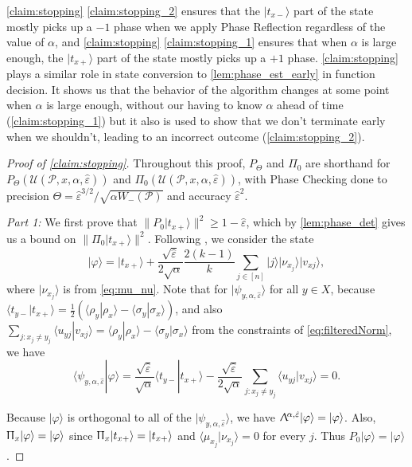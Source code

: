 \documentclass[cleveref, autoref, thm-restate,11pt]{article}
\theoremstyle{definition}
\newcommand{\sop}[1]{{\mathcal #1}}
\newcommand{\ket}[1]{|#1\rangle}
\newcommand{\braket}[2]{\langle{#1}|{#2}\rangle}
\newcommand{\Lalp}{{\Uplambda^{\!\alpha,\hat{\varepsilon}}}}
\newcommand{\PHxp}{\Uppi_{x}}
\newcommand{\Up}[4]{{\sop U({#1},{#2},{#3},{#4})}}
\begin{document}
\cref{claim:stopping} \cref{claim:stopping_2} ensures that the $\ket{t_{x-}}$ part of the state mostly
picks up a $-1$ phase when we apply Phase Reflection regardless of the value of $\alpha$, and \cref{claim:stopping} \cref{claim:stopping_1} ensures that when $\alpha$ is large enough, the $\ket{t_{x+}}$ part of the state mostly
picks up a $+1$ phase.
\cref{claim:stopping} plays a similar role in state conversion to \cref{lem:phase_est_early} in function decision. It shows us that
the behavior of the algorithm changes at some point when $\alpha$ is large enough,
without our having to know $\alpha$ ahead of time (\cref{claim:stopping_1}) but it 
also is used to show that we don't terminate early when we shouldn't, leading to an
incorrect outcome (\cref{claim:stopping_2}). 

\begin{proof}[Proof of \cref{claim:stopping}]
Throughout this proof, $P_\Theta$ and $\Pi_0$ are shorthand 
for $P_\Theta(\Up{\mathscr{P}}{x}{\alpha}{\hat{\varepsilon}})$ and 
$\Pi_0(\Up{\mathscr{P}}{x}{\alpha}{\hat{\varepsilon}})$, with Phase Checking done
to precision $\Theta=\hat{\varepsilon}^{3/2}/\sqrt{\alpha W_-(\mathscr P)}$ and accuracy 
$\hat{\varepsilon}^2$.

\vspace{.5cm}
\textit{Part 1:}
We first prove that
$\|P_0\ket{t_{x+}}\|^2\geq 1-\hat{\varepsilon}$, which by \cref{lem:phase_det} gives us a bound on $\|\Pi_0\ket{t_{x+}}\|^2$. Following \cite[Claim 4.4]{leeQuantumQueryComplexity2011}, we consider the state
\begin{equation}
\ket{\varphi}=\ket{t_{x+}}+\frac{\sqrt{\hat{\varepsilon}}}{2\sqrt{\alpha}}\frac{2(k-1)}{k}\sum_{j\in[n]}\ket{j}\ket{\nu_{x_j}}\ket{v_{xj}},
\end{equation}
where $\ket{\nu_{x_j}}$ is from \cref{eq:mu_nu}.
Note that for $\ket{\psi_{y,\alpha,\hat{\varepsilon}}}$ for all $y\in X$, because
$\braket{t_{y-}}{t_{x+}}=\frac{1}{2}\left(\braket{\rho_y}{\rho_x}-\braket{\sigma_y}{\sigma_x}\right)$,
and also $\sum_{j:x_j\neq
y_j}\braket{u_{yj}}{v_{xj}}=\braket{\rho_y}{\rho_x}-\braket{\sigma_y}{\sigma_x}$
from the constraints of \cref{eq:filteredNorm}, we have
\begin{equation}
\braket{\psi_{y,\alpha,\hat{\varepsilon}}}{\varphi}=\frac{\sqrt{\hat{\varepsilon}}}{\sqrt{\alpha}}\braket{t_{y-}}{t_{x+}}-\frac{\sqrt{\hat{\varepsilon}}}{2\sqrt{\alpha}}\sum_{j:x_j\neq y_j}\braket{u_{yj}}{v_{xj}}=0.
\end{equation}

Because $\ket{\varphi}$ is orthogonal to all of the $\ket{\psi_{y,\alpha,\hat{\varepsilon}}}$, we have
$\Lalp\ket{\varphi}=\ket{\varphi}$. Also, $\PHxp\ket{\varphi}=\ket{\varphi}$ since
$\PHxp\ket{t_{x+}}=\ket{t_{x+}}$ and $\braket{\mu_{x_j}}{\nu_{x_j}}=0$ for every $j$.
Thus $P_0\ket{\varphi}=\ket{\varphi}$. 


\end{proof}
\end{document}
